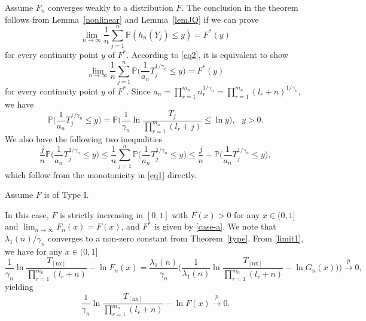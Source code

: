 \documentclass[11pt]{article}
\numberwithin{equation}{section}
\begin{document}
\vspace{10pt}

   Assume $F_n$
converges weakly to a distribution $F$. The conclusion in the
theorem follows from Lemma~\ref{nonlinear} and Lemma~\ref{lemJQ} if
we can prove
\[
\lim_{n\to\infty}\frac{1}{n}\sum^n_{j=1}\mathbb{P}(h_n(Y_j)\le
y)=F^*(y)
\]
for every continuity point $y$ of $F^*$. According to \eqref{eq2},
it is equivalent to show
\begin{equation}\label{expectation1}
\lim_{n\to\infty}\frac{1}{n}\sum^n_{j=1}\mathbb{P}\Big(\frac{1}{a_n}T_j^{1/\gamma_n}\le
y\Big)=F^*(y)
\end{equation}
for every continuity point $y$ of $F^*$.   Since
$a_n=\prod^{m_n}_{r=1}n_r^{1/\gamma_n}=\prod^{m_n}_{r=1}(l_r+n)^{1/\gamma_n}$,
we have
\begin{equation}\label{eq30}
\mathbb{P}\Big(\frac{1}{a_n}T_j^{1 / \gamma_{n}} \leq y\Big)=
\mathbb{P}\Big(\frac{1}{\gamma_{n}} \ln
\frac{T_{j}}{\prod_{r=1}^{m_{n}}\left(l_{r}+j\right)} \leq \ln
y\Big),~~~y>0.
\end{equation}
We also have the following two inequalities
\begin{equation}\label{estimates}
\frac{j}n\mathbb{P}\Big(\frac{1}{a_n}T_j^{1/ \gamma_{n}} \leq
y\Big)\le \frac{1}{n} \sum_{j=1}^{n}
\mathbb{P}\Big(\frac{1}{a_n}T_j^{1/ \gamma_{n}} \leq y\Big)\le
\frac{j}{n}+\mathbb{P}\Big(\frac{1}{a_n}T_j^{1/ \gamma_{n}} \leq
y\Big),
\end{equation}
which follow from the monotonicity in \eqref{eq1} directly.


 Assume $F$ is of Type I.

In this case, $F$ is strictly increasing in $[0,1]$ with $F(x)>0$
for any $x\in (0,1]$ and $\lim_{n\to\infty}F_n(x)=F(x)$, and $F^*$
is given by \eqref{case-a}. We note that $\lambda_1(n)/\gamma_n$
converges to a non-zero constant from Theorem~\ref{type}. From
\eqref{limit1}, we have for any $x\in (0,1]$
\[ \frac{1}{\gamma_n}\ln
\frac{T_{[\mathrm{nx}]}}{\prod_{r=1}^{m_n}(l_r+n)}-\ln F_n(x)=
\frac{\lambda_1(n)}{\gamma_n}\Big(\frac{1}{\lambda_1(n)} \ln
\frac{T_{[\mathrm{nx}]}}{\prod_{r=1}^{m_n}(l_r+n)}-\ln G_n(x))\Big)
\stackrel{p}{\rightarrow} 0,
 \]
yielding
  \begin{equation}\label{limit3}
\frac{1}{\gamma_n}\ln
\frac{T_{[\mathrm{nx}]}}{\prod_{r=1}^{m_n}(l_r+n)}-\ln F(x)
\stackrel{p}{\rightarrow} 0.
    \end{equation}
\end{document}
